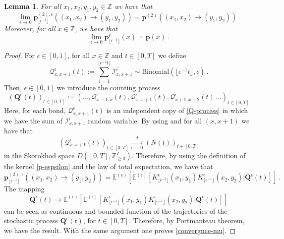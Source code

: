 \documentclass[a4paper,11pt,oneside,reqno]{amsart}
\newtheorem{lemma}[theorem]{Lemma}
\theoremstyle{definition}
\renewcommand{\geq}{\geqslant}
\numberwithin{equation}{section}
\begin{document}
\begin{lemma}\label{lemma-convergence2PTS}
	For all $x_{1},x_{2},y_{1},y_{2}\in \mathbb{Z}$ we have that
	\begin{equation}\label{convergence-p2}
		\lim_{\epsilon\to 0} \mathbf{p}_{\lfloor\epsilon^{-1}\rfloor}^{(2),\epsilon}\left((x_{1},x_{2})\to (y_{1},y_{2})\right)=\mathbf{p}^{(2)}\left((x_{1},x_{2})\to (y_{1},y_{2})\right)\,.
	\end{equation}
	Moreover, for all $x\in \mathbb{Z}$, we have that 
	\begin{equation}\label{convergnce-mu}
		\lim_{\epsilon\to 0}\mathbf{p}_{\lfloor\epsilon^{-1}\rfloor}^{\epsilon}(x)=\mathbf{p}(x)\,.
	\end{equation}
\end{lemma}
\begin{proof}
	For $\epsilon\in [0,1]$, for all $x\in \mathbb{Z}$ and $t\in [0,T]$ we define 
	\begin{equation}\label{Q-process}
		\mathcal{Q}^{\epsilon}_{x,x+1}(t):=\sum_{i=1}^{\lfloor\epsilon^{-1}t\rfloor}\mathcal{I}_{x,x+1}^{i}\sim \text{Binomial}(\lfloor\epsilon^{-1}t\rfloor,\epsilon)\,.
	\end{equation}
	Then, $\epsilon\in[0,1]$ we introduce the counting process 
	\begin{equation*}
		\left( \mathbf{Q}^{\epsilon}(t)\right)_{t\in[0,T]}:=\left(\ldots,\mathcal{Q}^{\epsilon}_{x-1,x}(t), \mathcal{Q}^{\epsilon}_{x,x+1}(t),\mathcal{Q}^{\epsilon}_{x+1,x+2}(t)\,\ldots\right)_{t\in[0,T]}
	\end{equation*}
	Here, for each bond, $\mathcal{Q}_{x,x+1}^{\epsilon}(t)$ is an independent copy of \eqref{Q-process} in which we have the sum of $\mathcal{I}^{i}_{x,x+1}$ random variable. By using \cite[Example 12.3]{billingsley} and for all $(x,x+1)$ we have that 
	\begin{equation*}
		\left(	\mathcal{Q}^{\epsilon}_{x,x+1}(t)\right)_{t\in[0,T]}\xrightarrow[\epsilon\to 0]{d}(N(t))_{t\in[0,T]}
	\end{equation*}
	in the Skorokhod space $D([0,T],\mathbb{Z}_{\geq 0}^{\mathbb{Z}})$. Therefore, by using the definition of the kernel \eqref{p-espsilon} and the law of total expectation, we have that 
	\begin{equation*}
		\mathbf{p}_{\lfloor\epsilon^{-1}\rfloor}^{(2),\epsilon}\left((x_{1},x_{2})\to (y_{1},y_{2})\right)=\mathbb{E}^{(\epsilon)}\left[\mathbb{E}^{(\epsilon)}\left[K_{\lfloor \epsilon^{-1}\rfloor}^{\epsilon}(x_{1},y_{1})K_{\lfloor \epsilon^{-1}\rfloor}^{\epsilon}(x_{2},y_{2})|\bm{Q}^{\epsilon}(t)\right]\right]\,.
	\end{equation*}
	The mapping  \begin{equation*}
		\bm{Q}^{\epsilon}(t)\to \mathbb{E}^{(\epsilon)}\left[\mathbb{E}^{(\epsilon)}\left[K_{\lfloor \epsilon^{-1}\rfloor}^{\epsilon}(x_{1},y_{1})K_{\lfloor \epsilon^{-1}\rfloor}^{\epsilon}(x_{2},y_{2})|\bm{Q}^{\epsilon}(t)\right]\right]       
	\end{equation*} 
	can be seen as continuous and bounded function of the trajectories of the stochastic process $\bm{Q}^{\epsilon}(t)$, for $t\in [0,T]$. Therefore, by Portmanteau theorem, we have the result. With the same argument one proves \eqref{convergnce-mu}. 
\end{proof}
\end{document}
